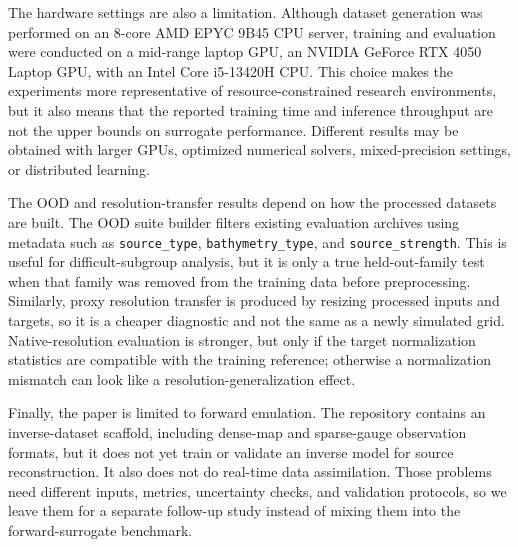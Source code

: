 The hardware settings are also a limitation. Although dataset generation was performed on an 8-core AMD EPYC 9B45 CPU server, training and evaluation were conducted on a mid-range laptop GPU, an NVIDIA GeForce RTX 4050 Laptop GPU, with an Intel Core i5-13420H CPU. This choice makes the experiments more representative of resource-constrained research environments, but it also means that the reported training time and inference throughput are not the upper bounds on surrogate performance. Different results may be obtained with larger GPUs, optimized numerical solvers, mixed-precision settings, or distributed learning.

The OOD and resolution-transfer results depend on how the processed datasets are built. The OOD suite builder filters existing evaluation archives using metadata such as \texttt{source\_type}, \texttt{bathymetry\_type}, and \texttt{source\_strength}. This is useful for difficult-subgroup analysis, but it is only a true held-out-family test when that family was removed from the training data before preprocessing. Similarly, proxy resolution transfer is produced by resizing processed inputs and targets, so it is a cheaper diagnostic and not the same as a newly simulated grid. Native-resolution evaluation is stronger, but only if the target normalization statistics are compatible with the training reference; otherwise a normalization mismatch can look like a resolution-generalization effect.

Finally, the paper is limited to forward emulation. The repository contains an inverse-dataset scaffold, including dense-map and sparse-gauge observation formats, but it does not yet train or validate an inverse model for source reconstruction. It also does not do real-time data assimilation. Those problems need different inputs, metrics, uncertainty checks, and validation protocols, so we leave them for a separate follow-up study instead of mixing them into the forward-surrogate benchmark.
